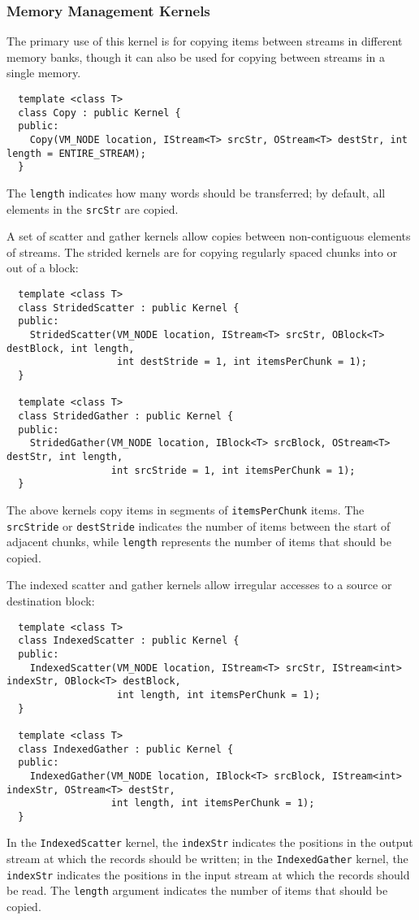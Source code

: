 \subsubsection*{Memory Management Kernels}

 The primary use of this kernel is for copying items
between streams in different memory banks, though it can also be used
for copying between streams in a single memory.
{\small
\begin{verbatim}
  template <class T>
  class Copy : public Kernel {
  public:
    Copy(VM_NODE location, IStream<T> srcStr, OStream<T> destStr, int length = ENTIRE_STREAM);
  }
\end{verbatim}}
The {\tt length} indicates how many words should be transferred; by
default, all elements in the {\tt srcStr} are copied.

 A set of scatter and gather kernels allow copies
between non-contiguous elements of streams.  The strided kernels are
for copying regularly spaced chunks into or out of a block:
{\small
\begin{verbatim}
  template <class T>
  class StridedScatter : public Kernel {
  public:
    StridedScatter(VM_NODE location, IStream<T> srcStr, OBlock<T> destBlock, int length,
                   int destStride = 1, int itemsPerChunk = 1);
  }

  template <class T>
  class StridedGather : public Kernel {
  public:
    StridedGather(VM_NODE location, IBlock<T> srcBlock, OStream<T> destStr, int length,
                  int srcStride = 1, int itemsPerChunk = 1);
  }  
\end{verbatim}}
The above kernels copy items in segments of {\tt itemsPerChunk} items.
The {\tt srcStride} or {\tt destStride} indicates the number of items
between the start of adjacent chunks, while {\tt length} represents
the number of items that should be copied.

The indexed scatter and gather kernels allow irregular accesses to a
source or destination block:
{\small
\begin{verbatim}
  template <class T>
  class IndexedScatter : public Kernel {
  public:
    IndexedScatter(VM_NODE location, IStream<T> srcStr, IStream<int> indexStr, OBlock<T> destBlock, 
                   int length, int itemsPerChunk = 1);
  }

  template <class T>
  class IndexedGather : public Kernel {
  public:
    IndexedGather(VM_NODE location, IBlock<T> srcBlock, IStream<int> indexStr, OStream<T> destStr, 
                  int length, int itemsPerChunk = 1);
  }  
\end{verbatim}}
In the {\tt IndexedScatter} kernel, the {\tt indexStr} indicates the
positions in the output stream at which the records should be written;
in the {\tt IndexedGather} kernel, the {\tt indexStr} indicates the
positions in the input stream at which the records should be read.
The {\tt length} argument indicates the number of items that should be
copied.

